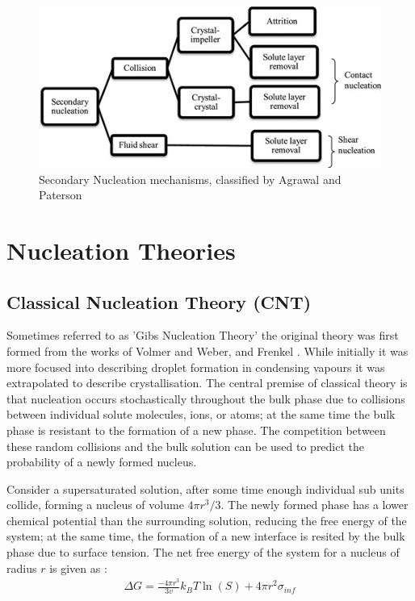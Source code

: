 \begin{figure}[h!]
	\includegraphics[width=\linewidth]{secondary_nucleation.jpg}
	\caption{Secondary Nucleation mechanisms, classified by Agrawal and Paterson \cite{Agrawal2015}}
\end{figure}

\section{Nucleation Theories}
\subsection{Classical Nucleation Theory (CNT)}
Sometimes referred to as 'Gibs Nucleation Theory' the 
original theory was first formed from the works of Volmer 
and Weber, and Frenkel \cite{Frenkel1939, Volmer1926}. 
While initially it was more focused into describing droplet 
formation in condensing vapours it was extrapolated to describe
crystallisation. The central premise of classical theory 
is that nucleation occurs stochastically throughout the bulk
phase due to collisions between individual solute molecules,
ions, or atoms; at the same time the bulk phase is resistant
to the formation of a new phase. The competition between
these random collisions and the bulk solution can be used to 
predict the probability of a newly formed nucleus.
 
Consider a supersaturated solution, after some time enough individual
sub units collide, forming a nucleus of volume $4\pi r^3/3$. 
The newly formed phase has a lower chemical potential than the 
surrounding solution, reducing the free energy of the system; 
at the same time, the formation of a new interface is resited 
by the bulk phase due to surface tension. The net free energy 
of the system for a nucleus of radius $r$ is given as \cite{Karthika2016}:
\begin{align}
	\Delta G = \frac{-4\pi r^3}{3v}k_BT\ln(S) + 4\pi r^{2}\sigma_{inf} 
\end{align}

